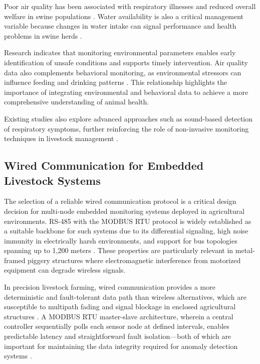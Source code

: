 Poor air quality has been associated with respiratory illnesses and reduced overall welfare in swine populations \cite{livestockproduction2026, yamsakul2025machine}. Water availability is also a critical management variable because changes in water intake can signal performance and health problems in swine herds \cite{whitney2018water, samuel2025water}.

Research indicates that monitoring environmental parameters enables early identification of unsafe conditions and supports timely intervention. Air quality data also complements behavioral monitoring, as environmental stressors can influence feeding and drinking patterns \cite{sadeghi2023improving, yamsakul2025machine}. This relationship highlights the importance of integrating environmental and behavioral data to achieve a more comprehensive understanding of animal health.

Existing studies also explore advanced approaches such as sound-based detection of respiratory symptoms, further reinforcing the role of non-invasive monitoring techniques in livestock management \cite{yamsakul2025machine}.

\subsection{Wired Communication for Embedded Livestock Systems}

The selection of a reliable wired communication protocol is a critical design decision for multi-node embedded monitoring systems deployed in agricultural environments. RS-485 with the MODBUS RTU protocol is widely established as a suitable backbone for such systems due to its differential signaling, high noise immunity in electrically harsh environments, and support for bus topologies spanning up to 1,200 meters \cite{adeoye2025animalia, arguta2024iop}. These properties are particularly relevant in metal-framed piggery structures where electromagnetic interference from motorized equipment can degrade wireless signals.

In precision livestock farming, wired communication provides a more deterministic and fault-tolerant data path than wireless alternatives, which are susceptible to multipath fading and signal blockage in enclosed agricultural structures \cite{carvalho2023iot, adeoye2025animalia}. A MODBUS RTU master-slave architecture, wherein a central controller sequentially polls each sensor node at defined intervals, enables predictable latency and straightforward fault isolation---both of which are important for maintaining the data integrity required for anomaly detection systems \cite{arguta2024iop, carvalho2023iot}.

